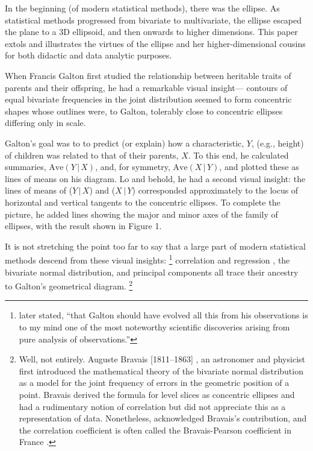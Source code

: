 \documentclass[11pt]{article}%
\newcommand*{\todo}[1]{\marginpar{ToDo:\small{#1}}}
\newcommand*{\given}{\ensuremath{\, | \,}}
\begin{document}
In the beginning (of modern  statistical methods), there was the  ellipse. As statistical
methods progressed from bivariate to multivariate, the ellipse escaped the plane to a 3D
ellipsoid, and then onwards to higher dimensions.
This  paper extols and illustrates the
virtues of the ellipse and her higher-dimensional cousins for both didactic and
data analytic purposes.

When
Francis Galton  \citeyearpar{Galton:1886} first  studied the  relationship between  heritable traits of
parents and their offspring, he  had a remarkable visual insight--- contours of
equal bivariate frequencies in the joint distribution seemed to form  concentric
shapes whose outlines  were, to Galton,  tolerably close to  concentric ellipses
differing only in scale.

Galton's goal was to  to predict (or explain)  how a characteristic, $Y$,   (e.g.,
height) of children was  related to that of  their parents, $X$.  To  this end, he
calculated summaries,  $\mathrm{Ave}(Y\given X)$,  and, for  symmetry, $\mathrm{Ave}(X\given Y)$, and plotted
these as lines of means on his  diagram.  Lo and behold, he had a  second visual
insight:  the lines  of means of  ($Y\given X$) and ($X\given Y$)  corresponded approximately to
the locus of  horizontal and vertical  tangents to the  concentric ellipses.  To
complete the picture,  he added lines  showing the major  and minor axes  of the
family of ellipses, with the result shown in Figure 1.

It is  not stretching  the point  too far  to say  that a  large part  of modern
statistical  methods  descend  from  these  visual  insights:%
\footnote{\citet[p. 37]{Pearson:1920} later stated, ``that Galton
should have evolved all this from his observations is to my mind one
of the most noteworthy scientific discoveries arising from pure
analysis of observations.'' }
correlation   and
regression \citep{Pearson:1896}, the  bivariate normal  distribution,
and principal components  \citep{Pearson:1901,Hotelling:1933}  all trace their ancestry to Galton's  geometrical
diagram.%
\footnote{
Well, not entirely. Auguste Bravais [1811--1863] \citeyearpar{Bravais:1846}, an astronomer
and physicist first introduced the mathematical theory of the bivariate normal distribution
as a model for the joint frequency of errors in the geometric position of a point.
Bravais derived the formula for level slices as concentric ellipses and had a rudimentary
notion of correlation but did not appreciate this as a representation of data.
Nonetheless, \cite{Pearson:1920} acknowledged Bravais's contribution, and the correlation
coefficient is often called the Bravais-Pearson coefficient in France
\citep{Denis:2001}. }
\end{document}
